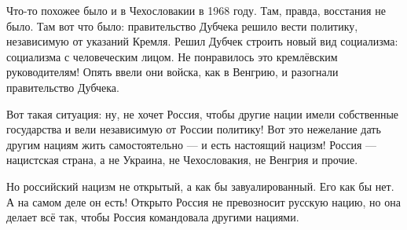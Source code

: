 Что-то
похожее было и в Чехословакии в 1968 году. Там, правда, восстания не
было. Там вот что было: правительство Дубчека решило вести политику,
независимую от указаний Кремля. Решил Дубчек строить новый вид
социализма: социализма с человеческим лицом. Не понравилось это
кремлёвским руководителям! Опять ввели они войска, как в Венгрию, и
разогнали правительство Дубчека.

Вот
такая ситуация: ну, не хочет Россия, чтобы другие нации имели
собственные государства и вели независимую от России политику! Вот это
нежелание дать другим нациям жить самостоятельно — и есть настоящий
нацизм! Россия — нацистская страна, а не Украина, не Чехословакия, не
Венгрия и прочие.

Но
российский нацизм не открытый, а как бы завуалированный. Его как бы
нет. А на самом деле он есть! Открыто Россия не превозносит русскую
нацию, но она делает всё так, чтобы Россия командовала другими нациями.


